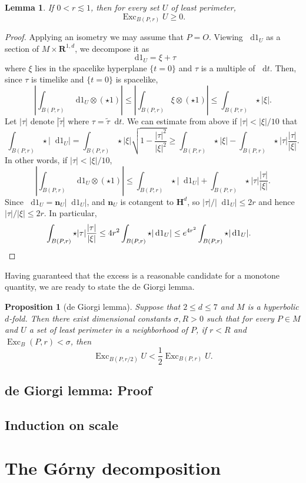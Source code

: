 \documentclass[reqno,12pt,letterpaper]{amsart}
\newcommand{\RR}{\mathbf{R}}
\newcommand{\Hyp}{\mathbf H}
\DeclareMathOperator{\Exc}{Exc}
\newcommand*\dif{\mathop{}\!\mathrm{d}}
\newcommand{\normal}{\mathbf n}
\newtheorem{lemma}[theorem]{Lemma}
\newtheorem{proposition}[theorem]{Proposition}
\theoremstyle{definition}
\numberwithin{equation}{section}
\begin{document}
\begin{lemma}
If $0 < r \lesssim 1$, then for every set $U$ of least perimeter,
$$\Exc_{B(P, r)} U \geq 0.$$
\end{lemma}
\begin{proof}
Applying an isometry we may assume that $P = O$.
Viewing $\dif 1_U$ as a section of $M \times \RR^{1, d}$, we decompose it as
$$\dif 1_U = \xi + \tau$$
where $\xi$ lies in the spacelike hyperplane $\{t = 0\}$ and $\tau$ is a multiple of $\dif t$.
Then, since $\tau$ is timelike and $\{t = 0\}$ is spacelike,
$$\left|\int_{B(P, r)} \dif 1_U \otimes (\star 1)\right| \leq \left|\int_{B(P, r)} \xi \otimes (\star 1)\right| \leq \int_{B(P, r)} \star |\xi|.$$
Let $|\tau|$ denote $|\tilde \tau|$ where $\tau = \tilde \tau \dif t$.
We can estimate from above if $|\tau| < |\xi|/10$ that
$$\int_{B(P, r)} \star |\dif 1_U| = \int_{B(P, r)} \star |\xi| \sqrt{1 - \frac{|\tau|^2}{|\xi|^2}} \geq \int_{B(P, r)} \star |\xi| - \int_{B(P, r)} \star |\tau| \frac{|\tau|}{|\xi|}.$$
In other words, if $|\tau| < |\xi|/10$,
$$\left|\int_{B(P, r)} \dif 1_U \otimes (\star 1)\right| \leq \int_{B(P, r)} \star |\dif 1_U| + \int_{B(P, r)} \star |\tau| \frac{|\tau|}{|\xi|}.$$
Since $\dif 1_U = \normal_U |\dif 1_U|$, and $\normal_U$ is cotangent to $\Hyp^d$, so $|\tau|/|\dif 1_U| \leq 2r$ and hence $|\tau|/|\xi| \leq 2r$. In particular,
\begin{align*}
\int_{B(P, r)} \star |\tau| \frac{|\tau|}{|\xi|} &\leq 4r^2 \int_{B(P, r)} \star |\dif 1_U| \leq e^{4r^2} \int_{B(P, r)} \star |\dif 1_U|. \qedhere
\end{align*}
\end{proof}

Having guaranteed that the excess is a reasonable candidate for a monotone quantity, we are ready to state the de Giorgi lemma.

\begin{proposition}[de Giorgi lemma]\label{dGL final}
Suppose that $2 \leq d \leq 7$ and $M$ is a hyperbolic $d$-fold.
Then there exist dimensional constants $\sigma, R > 0$ such that for every $P \in M$ and $U$ a set of least perimeter in a neighborhood of $P$, if $r < R$ and $\Exc_B(P, r) < \sigma$, then
$$\Exc_{B(P, r/2)} U < \frac{1}{2} \Exc_{B(P, r)} U.$$
\end{proposition}


\subsection{de Giorgi lemma: Proof}


\subsection{Induction on scale}


\section{The G\'orny decomposition}\label{GornySec}




\printbibliography
\end{document}
